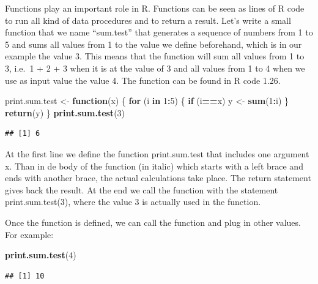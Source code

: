 \documentclass[]{book}
\newenvironment{Shaded}{\begin{snugshade}}{\end{snugshade}}
\newcommand{\KeywordTok}[1]{\textcolor[rgb]{0.13,0.29,0.53}{\textbf{#1}}}
\newcommand{\DecValTok}[1]{\textcolor[rgb]{0.00,0.00,0.81}{#1}}
\newcommand{\StringTok}[1]{\textcolor[rgb]{0.31,0.60,0.02}{#1}}
\newcommand{\ControlFlowTok}[1]{\textcolor[rgb]{0.13,0.29,0.53}{\textbf{#1}}}
\newcommand{\OperatorTok}[1]{\textcolor[rgb]{0.81,0.36,0.00}{\textbf{#1}}}
\newcommand{\NormalTok}[1]{#1}
\theoremstyle{definition}
\theoremstyle{definition}
\theoremstyle{definition}
\theoremstyle{remark}
\begin{document}
Functions play an important role in R. Functions can be seen as lines of
R code to run all kind of data procedures and to return a result. Let's
write a small function that we name ``sum.test'' that generates a
sequence of numbers from 1 to 5 and sums all values from 1 to the value
we define beforehand, which is in our example the value 3. This means
that the function will sum all values from 1 to 3, i.e.~1 + 2 + 3 when
it is at the value of 3 and all values from 1 to 4 when we use as input
value the value 4. The function can be found in R code 1.26.

\begin{Shaded}
\begin{Highlighting}[]
\NormalTok{print.sum.test <-}\StringTok{ }\ControlFlowTok{function}\NormalTok{(x) }
\NormalTok{\{}
 \ControlFlowTok{for}\NormalTok{ (i }\ControlFlowTok{in} \DecValTok{1}\OperatorTok{:}\DecValTok{5}\NormalTok{) }
\NormalTok{ \{}
   \ControlFlowTok{if}\NormalTok{ (i}\OperatorTok{==}\NormalTok{x) y <-}\StringTok{ }\KeywordTok{sum}\NormalTok{(}\DecValTok{1}\OperatorTok{:}\NormalTok{i)  }
\NormalTok{ \}}
\KeywordTok{return}\NormalTok{(y)}
\NormalTok{\}}
\KeywordTok{print.sum.test}\NormalTok{(}\DecValTok{3}\NormalTok{)}
\end{Highlighting}
\end{Shaded}

\begin{verbatim}
## [1] 6
\end{verbatim}

At the first line we define the function print.sum.test that includes
one argument x. Than in de body of the function (in italic) which starts
with a left brace and ends with another brace, the actual calculations
take place. The return statement gives back the result. At the end we
call the function with the statement print.sum.test(3), where the value
3 is actually used in the function.

Once the function is defined, we can call the function and plug in other
values. For example:

\begin{Shaded}
\begin{Highlighting}[]
\KeywordTok{print.sum.test}\NormalTok{(}\DecValTok{4}\NormalTok{)}
\end{Highlighting}
\end{Shaded}

\begin{verbatim}
## [1] 10
\end{verbatim}
\end{document}
